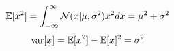 $$\mathbb{E}[x^2]=\int_{-\infty}^{\infty}{{\cal N}(x|\mu, \sigma^{2})x^{2}dx}=\mu^{2}+\sigma^{2}$$
$${\rm var}[x]=\mathbb{E}[x^2]-\mathbb{E}[x]^{2}=\sigma^{2}$$
